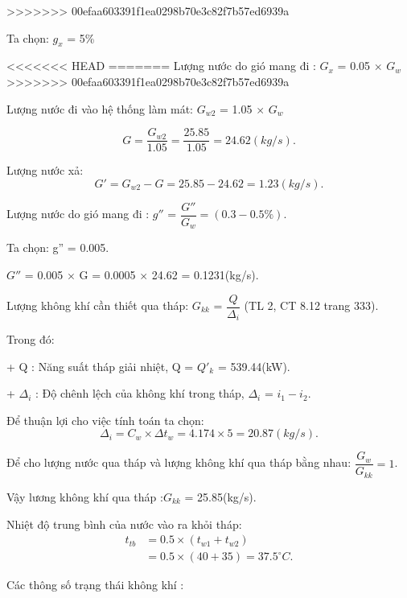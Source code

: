 \newpage
>>>>>>> 00efaa603391f1ea0298b70e3c82f7b57ed6939a

Ta chọn: $g_{x}$ = 5\%

<<<<<<< HEAD
=======
Lượng nước do gió mang đi : $G_{x}$ = 0.05 $\times$ $G_{w}$
>>>>>>> 00efaa603391f1ea0298b70e3c82f7b57ed6939a

Lượng nước đi vào hệ thống làm mát: $G_{w2}$ = 1.05 $\times$ $G_{w}$

\begin{equation*}
	 G = \dfrac{G_{w2}}{1.05}= \dfrac{25.85}{1.05}=24.62(kg/s).
\end{equation*}

Lượng nước xả:
\begin{equation*}
	G' = G_{w2} - G = 25.85 - 24.62 = 1.23(kg/s).
\end{equation*}

Lượng nước do gió mang đi : $g''$ = $\dfrac{G''}{G_{w}} = (0.3 - 0.5\%)$.

Ta chọn: g'' = 0.005.

$G''$ = 0.005 $\times$ G = 0.0005 $\times$ 24.62 = 0.1231(kg/s).

Lượng không khí cần thiết qua tháp:
$G_{kk}$ = $\dfrac{Q}{\Delta_{i}}$ (TL 2, CT 8.12 trang 333).

Trong đó:

+ Q : Năng suất tháp giải nhiệt, Q = $Q'_{k}$ = 539.44(kW).

+ $\Delta_{i}$ : Độ chênh lệch của không khí trong tháp, $\Delta_{i}$ = $i_{1} - i_{2}$.  

Để thuận lợi cho việc tính toán ta chọn:
\begin{equation*}
	\Delta_{i} = C_{w} \times \Delta t_{w} = 4.174 \times 5 = 20.87(kg/s).
\end{equation*}

Để cho lượng nước qua tháp và lượng không khí qua tháp bằng nhau: $\dfrac{G_{w}}{G_{kk}} = 1$.

Vậy lương không khí qua tháp :$G_{kk}$ = 25.85(kg/s).

Nhiệt độ trung bình của nước vào ra khỏi tháp:
\begin{equation*}
	\begin{split}
		t_{tb}& = 0.5 \times (t_{w1} + t_{w2})\\ 
		      & = 0.5 \times (40 + 35) = 37.5^{\circ}C.
	\end{split}
\end{equation*}

Các thông số trạng thái không khí :

